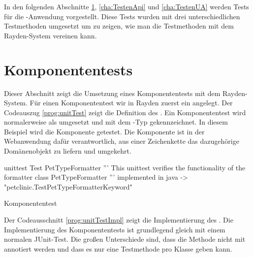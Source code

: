 \SuperPar
In den folgenden Abschnitte \ref{cha:TestenUnit}, \ref{cha:TestenApi} und \ref{cha:TestenUA} werden Tests für die -Anwendung vorgestellt. Diese Tests wurden mit drei unterschiedlichen Testmethoden umgesetzt um zu zeigen, wie man die Testmethoden mit dem Rayden-System vereinen kann.

\section{Komponententests}
\label{cha:TestenUnit}

Dieser Abschnitt zeigt die Umsetzung eines Komponententests mit dem Rayden-System. Für einen Komponententest wir in Rayden zuerst ein  angelegt. Der Codeauszug \ref{prog:unitTest} zeigt die Definition des . Ein Komponententest wird normalerweise als  umgesetzt und mit dem -Typ  gekennzeichnet. In diesem Beispiel wird die Komponente  getestet. Die Komponente ist in der Webanwendung dafür verantwortlich, aus einer Zeichenkette das dazugehörige Domänenobjekt zu liefern und umgekehrt. 

\begin{program}
\begin{JavaCode}
unittest Test PetTypeFormatter {
	''' This unittest verifies the functionality of the 
	    formatter class PetTypeFormatter '''
	implemented in java -> "petclinic.TestPetTypeFormatterKeyword"
}
\end{JavaCode}
\caption{Komponententest }
\label{prog:unitTest}
\end{program}

\SuperPar
Der Codeausschnitt \ref{prog:unitTestImpl} zeigt die Implementierung des . Die Implementierung des Komponententests ist grundlegend gleich mit einem normalen JUnit-Test. Die großen Unterschiede sind, dass die Methode nicht mit  annotiert werden und dass es nur eine Testmethode pro Klasse geben kann. 

